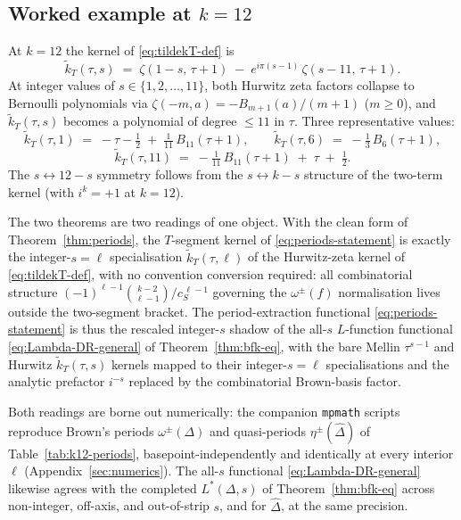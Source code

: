 \documentclass[11pt]{article}
\numberwithin{equation}{section}  %
\newcommand{\Dhat}{\widehat{\Delta}}
\begin{document}
\subsection{Worked example at $k = 12$}\label{subsec:k12-worked}

At $k = 12$ the kernel of \eqref{eq:tildekT-def} is
\begin{equation}
  \widetilde{k}_T(\tau, s)
  \;=\; \zeta(1 - s,\,\tau + 1)
  \;-\; e^{i\pi(s-1)}\,\zeta(s - 11,\,\tau + 1).
\end{equation}
At integer values of $s \in \{1, 2, \ldots, 11\}$, both Hurwitz zeta
factors collapse to Bernoulli polynomials via $\zeta(-m, a) =
-B_{m+1}(a)/(m+1)$ ($m \ge 0$), and $\widetilde{k}_T(\tau, s)$
becomes a polynomial of degree $\le 11$ in $\tau$.  Three
representative values:
\begin{equation}
  \widetilde{k}_T(\tau, 1)
  \;=\; -\tau - \tfrac{1}{2} \;+\; \tfrac{1}{11}\,B_{11}(\tau + 1),
  \qquad
  \widetilde{k}_T(\tau, 6)
  \;=\; -\tfrac{1}{3}\,B_6(\tau + 1),
\end{equation}
\begin{equation}
  \widetilde{k}_T(\tau, 11)
  \;=\; -\tfrac{1}{11}\,B_{11}(\tau + 1) \;+\; \tau \;+\; \tfrac{1}{2}.
\end{equation}
The $s \leftrightarrow 12 - s$ symmetry follows from the
$s \leftrightarrow k - s$ structure of the two-term kernel (with
$i^k = +1$ at $k = 12$).

The two theorems are two readings of one object.  With the clean form of
Theorem~\ref{thm:periods}, the $T$-segment
kernel of \eqref{eq:periods-statement} is exactly the integer-$s = \ell$
specialisation $\widetilde{k}_T(\tau, \ell)$ of the Hurwitz-zeta kernel
of \eqref{eq:tildekT-def}, with no convention conversion required:
all combinatorial structure $(-1)^{\ell - 1}\binom{k - 2}{\ell - 1}/c_S^{\,\ell - 1}$
governing the $\omega^\pm(f)$ normalisation lives outside the
two-segment bracket.  The period-extraction functional
\eqref{eq:periods-statement} is thus the rescaled integer-$s$ shadow
of the all-$s$ $L$-function functional \eqref{eq:Lambda-DR-general}
of Theorem~\ref{thm:bfk-eq}, with the bare Mellin $\tau^{s - 1}$ and
Hurwitz $\widetilde{k}_T(\tau, s)$ kernels mapped to their integer-$s = \ell$
specialisations and the analytic prefactor $i^{-s}$ replaced by the
combinatorial Brown-basis factor.

Both readings are borne out numerically: the companion \texttt{mpmath}
scripts \cite{VerifyScripts} reproduce Brown's periods
$\omega^\pm(\Delta)$ and quasi-periods $\eta^\pm(\Dhat)$ of
Table~\ref{tab:k12-periods}, basepoint-independently and identically at
every interior $\ell$ (Appendix~\ref{sec:numerics}).  The all-$s$
functional \eqref{eq:Lambda-DR-general} likewise agrees with the completed
$L^*(\Delta, s)$ of Theorem~\ref{thm:bfk-eq} across non-integer, off-axis,
and out-of-strip $s$, and for $\Dhat$, at the same precision.
\end{document}
